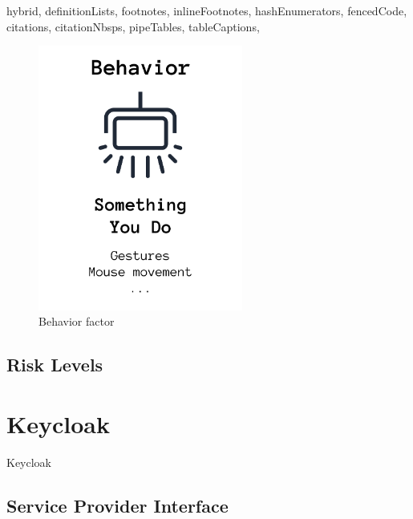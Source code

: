 \documentclass[
  digital,     %
  oneside,     %
  nosansbold,  %
  nocolorbold, %
  lof,         %
  lot,         %
]{fithesis4}
\begin{document}
\begin{markdown*}{%
  hybrid,
  definitionLists,
  footnotes,
  inlineFootnotes,
  hashEnumerators,
  fencedCode,
  citations,
  citationNbsps,
  pipeTables,
  tableCaptions,
}
\begin{figure}[htbp]
  \centering
  \includegraphics[width=0.6\textwidth]{img/behavior-final.png}
  \caption{Behavior factor}
  \label{fig:behavior-factor}
\end{figure}


\newpage
\section{Risk Levels}

\chapter{Keycloak}
Keycloak

\section{Service Provider Interface}

\end{markdown*}


\shorthandon{-}
\end{document}
